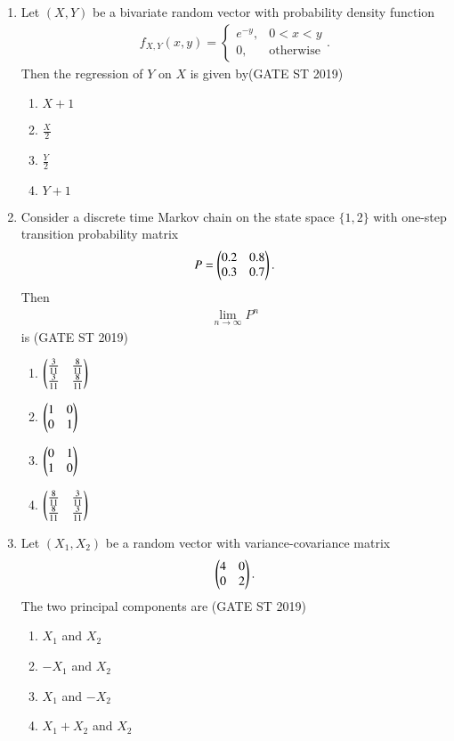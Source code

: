 \documentclass[journal]{IEEEtran}
\begin{document}
\begin{enumerate}[start=1]
\item Let \((X, Y)\) be a bivariate random vector with probability density function
\begin{align*}
f_{X,Y}(x,y) = \begin{cases}
e^{-y}, & 0 < x < y \\
0, & \text{otherwise}
\end{cases}.
\end{align*}
Then the regression of \(Y\) on \(X\) is given by\hfill(GATE ST 2019)
\begin{multicols}{4}
\begin{enumerate}
\item \(X + 1\)
\item \(\frac{X}{2}\)
\item \(\frac{Y}{2}\)
\item \(Y + 1\)
\end{enumerate}
\end{multicols}

\item Consider a discrete time Markov chain on the state space \(\{1, 2\}\) with one-step transition probability matrix
\begin{align*}
P = \begin{pmatrix}0.2 & 0.8 \\
0.3 & 0.7\end{pmatrix}.
\end{align*}
Then
\begin{align*}
\lim_{n \to \infty} P^n
\end{align*} is \hfill(GATE ST 2019)
\begin{multicols}{4}
\begin{enumerate}
\item \(\begin{pmatrix}\frac{3}{11} & \frac{8}{11} \\ \frac{3}{11} & \frac{8}{11}\end{pmatrix}\)
\item \(\begin{pmatrix} 1 & 0 \\ 0 & 1\end{pmatrix}\)
\item \(\begin{pmatrix} 0 & 1 \\ 1 & 0 \end{pmatrix}\)
\item \(\begin{pmatrix} \frac{8}{11} & \frac{3}{11} \\ \frac{8}{11} & \frac{3}{11}\end{pmatrix}\)
\end{enumerate}
\end{multicols}

\item Let \((X_1, X_2)\) be a random vector with variance-covariance matrix
\begin{align*}
\begin{pmatrix}
4 & 0 \\
0 & 2\end{pmatrix}.
\end{align*}
The two principal components are \hfill(GATE ST 2019)
\begin{multicols}{4}
\begin{enumerate}
\item \(X_1\) and \(X_2\)
\item \(-X_1\) and \(X_2\)
\item \(X_1\) and \(-X_2\)
\item \(X_1 + X_2\) and \(X_2\)
\end{enumerate}
\end{multicols}


\end{enumerate}
\end{document}
